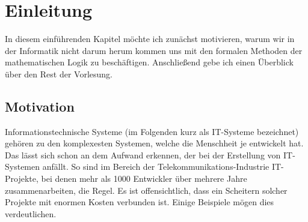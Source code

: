 \chapter{Einleitung}
In diesem einführenden Kapitel möchte ich zunächst motivieren, warum wir in der Informatik
nicht darum herum kommen uns mit den formalen Methoden der mathematischen Logik zu beschäftigen.
Anschließend gebe ich einen Überblick über den Rest der Vorlesung.

\section{Motivation}
Informationstechnische Systeme 
(im Folgenden kurz als IT-Systeme bezeichnet) gehören zu den komplexesten Systemen, welche
die Menschheit je entwickelt hat.  Das lässt sich schon an dem Aufwand erkennen,
der bei der Erstellung von IT-Systemen anfällt.  So sind im Bereich der Telekommunikations-Industrie
IT-Projekte, bei denen mehr als 1000 Entwickler über mehrere Jahre zusammenarbeiten,
die Regel.  Es ist offensichtlich, dass ein Scheitern solcher Projekte mit enormen
Kosten verbunden ist.  Einige Beispiele mögen dies verdeutlichen.
